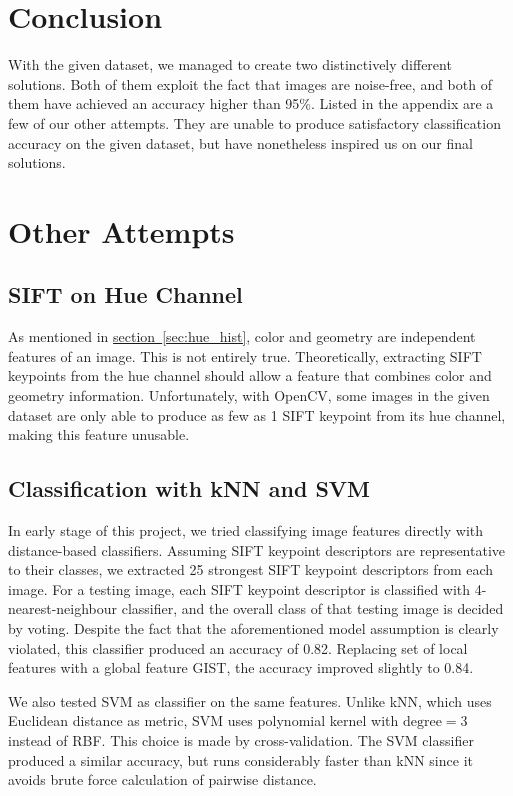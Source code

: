 \documentclass[11pt,a4paper]{article}
\begin{document}
\section{Conclusion}

With the given dataset, we managed to create two distinctively different solutions. Both of them exploit the fact that images are noise-free, and both of them have achieved an accuracy higher than 95\%. Listed in the appendix are a few of our other attempts. They are unable to produce satisfactory classification accuracy on the given dataset, but have nonetheless inspired us on our final solutions.

\clearpage
\appendix
\section{Other Attempts}
\subsection{SIFT on Hue Channel}

As mentioned in \hyperref[sec:hue_hist]{section~\ref{sec:hue_hist}}, color and geometry are independent features of an image. This is not entirely true. Theoretically, extracting SIFT keypoints from the hue channel should allow a feature that combines color and geometry information. Unfortunately, with OpenCV, some images in the given dataset are only able to produce as few as 1 SIFT keypoint from its hue channel, making this feature unusable.

\subsection{Classification with kNN and SVM}

In early stage of this project, we tried classifying image features directly with distance-based classifiers. Assuming SIFT keypoint descriptors are representative to their classes, we extracted 25 strongest SIFT keypoint descriptors from each image. For a testing image, each SIFT keypoint descriptor is classified with 4-nearest-neighbour classifier, and the overall class of that testing image is decided by voting. Despite the fact that the aforementioned model assumption is clearly violated, this classifier produced an accuracy of 0.82. Replacing set of local features with a global feature GIST, the accuracy improved slightly to 0.84.

We also tested SVM as classifier on the same features. Unlike kNN, which uses Euclidean distance as metric, SVM uses polynomial kernel with $\text{degree}=3$ instead of RBF. This choice is made by cross-validation. The SVM classifier produced a similar accuracy, but runs considerably faster than kNN since it avoids brute force calculation of pairwise distance.
\end{document}
